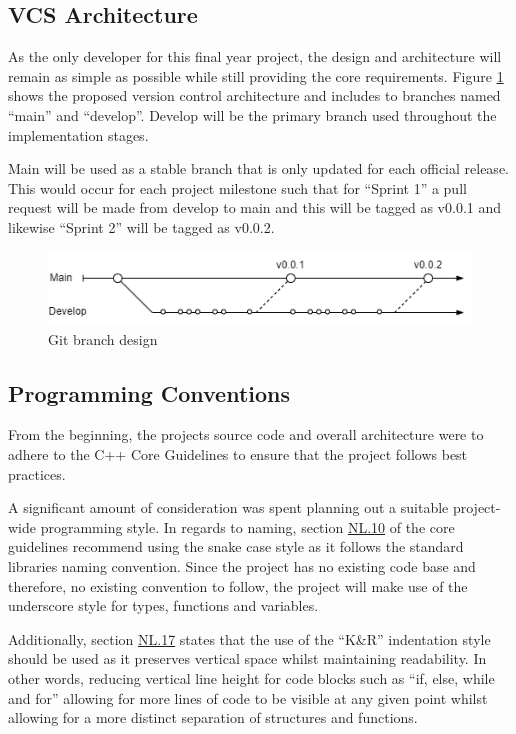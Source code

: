 \documentclass[11pt]{article}
\begin{document}
\subsection{VCS Architecture}

As the only developer for this final year project, the design and architecture
will remain as simple as possible while still providing the core requirements.
Figure \ref{fig:brancharch} shows the proposed version control architecture and
includes to branches named ``main'' and ``develop''. Develop will be the primary
branch used throughout the implementation stages. 

Main will be used as a stable branch that is only updated for each official release.
This would occur for each project milestone such that for ``Sprint 1'' a pull request
will be made from develop to main and this will be tagged as v0.0.1 and likewise 
``Sprint 2'' will be tagged as v0.0.2.

\begin{figure}[h!]
  \centering
  \includegraphics[width=\textwidth]{images/current_branch_design.png}
  \caption{Git branch design}
  \label{fig:brancharch}
\end{figure}



\subsection{Programming Conventions}
From the beginning, the projects source code and overall architecture were to
adhere to the C++ Core Guidelines \cite{cpp-guidelines} to ensure that the
project follows best practices.

A significant amount of consideration was spent planning out a suitable
project-wide programming style. In regards to naming, section
\href{http://isocpp.github.io/CppCoreGuidelines/CppCoreGuidelines#nl10-prefer-underscore_style-names}{NL.10}
of the core guidelines recommend using the snake case style as it follows the
standard libraries naming convention. Since the project has no existing code
base and therefore, no existing convention to follow, the project will make use
of the underscore style for types, functions and variables. 

Additionally, section
\href{https://isocpp.github.io/CppCoreGuidelines/CppCoreGuidelines#nl17-use-kr-derived-layout}{NL.17}
states that the use of the ``K\&R''  indentation style \cite{indentation} should
be used as it preserves vertical space whilst maintaining readability. In other
words, reducing vertical line height for code blocks such as ``if, else, while
and for'' allowing for more lines of code to be visible at any given point
whilst allowing for a more distinct separation of structures and functions.
\end{document}
